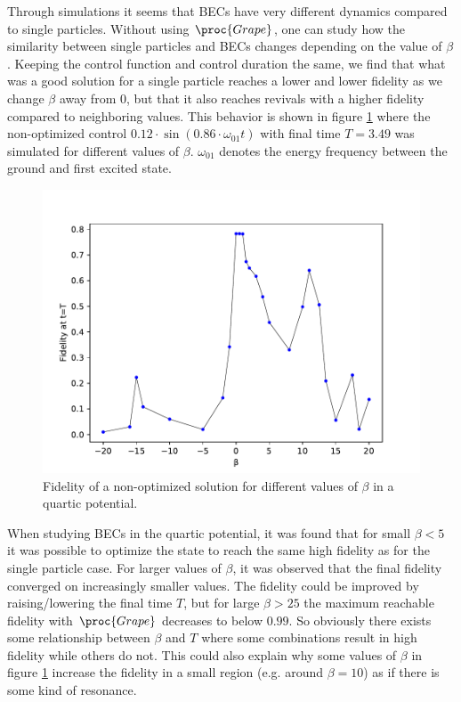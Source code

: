 \documentclass[aps,pra,reprint,superscriptaddress]{revtex4-1}
\begin{document}
Through simulations it seems that BECs have very different dynamics compared to single particles. Without using $\proc{Grape}$, one can study how the similarity between single particles and BECs changes depending on the value of $\beta$. Keeping the control function and control duration the same, we find that what was a good solution for a single particle reaches a lower and lower fidelity as we change $\beta$ away from 0, but that it also reaches revivals with a higher fidelity compared to neighboring values. This behavior is shown in figure \ref{fig:beta} where the non-optimized control $0.12\cdot\sin(0.86\cdot \omega_{01} t)$ with final time $T=3.49$ was simulated for different values of $\beta$. $\omega_{01}$ denotes the energy frequency between the ground and first excited state.

\begin{figure}[h]
	\includegraphics[width=\columnwidth]{graphics/beta.pdf}
	\caption{Fidelity of a non-optimized solution for different values of $\beta$ in a quartic potential.}
	\label{fig:beta}
\end{figure}

When studying BECs in the quartic potential, it was found that for small $\beta<5$ it was possible to optimize the state to reach the same high fidelity as for the single particle case. For larger values of $\beta$, it was observed that the final fidelity converged on increasingly smaller values. The fidelity could be improved by raising/lowering the final time $T$, but for large $\beta > 25$ the maximum reachable fidelity with $\proc{Grape}$ decreases to below $0.99$. So obviously there exists some relationship between $\beta$ and $T$ where some combinations result in high fidelity while others do not. This could also explain why some values of $\beta$ in figure \ref{fig:beta} increase the fidelity in a small region (e.g. around $\beta=10$) as if there is some kind of resonance. \\
\end{document}
